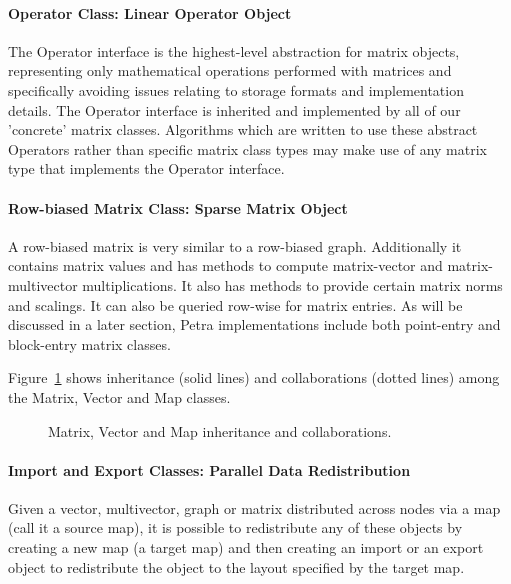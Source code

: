 \documentclass[12pt,relax]{PetraObjectModel}
\begin{document}
\paragraph{Operator Class: Linear Operator Object}

The Operator interface is the highest-level abstraction for matrix objects,
representing only mathematical operations performed with matrices and
specifically avoiding issues relating to storage formats and implementation
details. The Operator interface is inherited and implemented by all of our
'concrete' matrix classes.  Algorithms which are written to use these
abstract Operators rather than specific matrix class types may make use of
any matrix type that implements the Operator interface.

\paragraph{Row-biased Matrix Class: Sparse Matrix Object}

A row-biased matrix is very similar to a row-biased graph.  Additionally it 
contains matrix values and has methods to compute matrix-vector and
matrix-multivector multiplications.  It also has methods to provide certain
matrix norms and scalings.  It can also be queried row-wise for matrix entries.
As will be discussed in a later section, Petra implementations include both
point-entry and block-entry matrix classes.

Figure~\ref{matvecmap} shows inheritance (solid lines) and collaborations
(dotted lines) among the Matrix, Vector and Map classes.
\begin{figure}[ht]
\begin{center}
\caption{Matrix, Vector and Map inheritance and collaborations.}
\label{matvecmap}
\end{center}
\end{figure}


\paragraph{Import and Export Classes:  Parallel Data Redistribution}

Given a vector, multivector, graph or matrix distributed across nodes via a map (call 
it a source map), it is possible to redistribute any of these objects by creating a 
new map (a target map) and then creating an import or an export object to redistribute 
the object to the layout specified by the target map.
\end{document}
